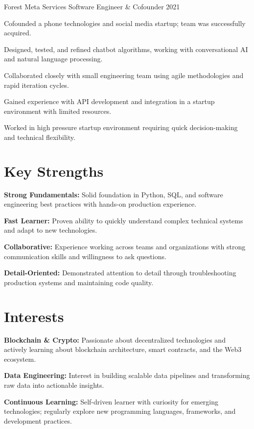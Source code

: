 \documentclass{../styles/cv}
\begin{document}
\subsectionpositiondate
    {Forest Meta Services}
    {Software Engineer \& Cofounder}
    {2021}
\resumesublistbegin
    \item Cofounded a phone technologies and social media startup; team was successfully acquired.
    \item Designed, tested, and refined chatbot algorithms, working with conversational AI and natural language processing.
    \item Collaborated closely with small engineering team using agile methodologies and rapid iteration cycles.
    \item Gained experience with API development and integration in a startup environment with limited resources.
    \item Worked in high pressure startup environment requiring quick decision-making and technical flexibility.
\resumesublistend

\section{Key Strengths}
\resumesublistbegin
    \item \textbf{Strong Fundamentals:} Solid foundation in Python, SQL, and software engineering best practices with hands-on production experience.
    \item \textbf{Fast Learner:} Proven ability to quickly understand complex technical systems and adapt to new technologies.
    \item \textbf{Collaborative:} Experience working across teams and organizations with strong communication skills and willingness to ask questions.
    \item \textbf{Detail-Oriented:} Demonstrated attention to detail through troubleshooting production systems and maintaining code quality.
\resumesublistend

\section{Interests}
\resumesublistbegin
    \item \textbf{Blockchain \& Crypto:} Passionate about decentralized technologies and actively learning about blockchain architecture, smart contracts, and the Web3 ecosystem.
    \item \textbf{Data Engineering:} Interest in building scalable data pipelines and transforming raw data into actionable insights.
    \item \textbf{Continuous Learning:} Self-driven learner with curiosity for emerging technologies; regularly explore new programming languages, frameworks, and development practices.
\resumesublistend
\end{document}
